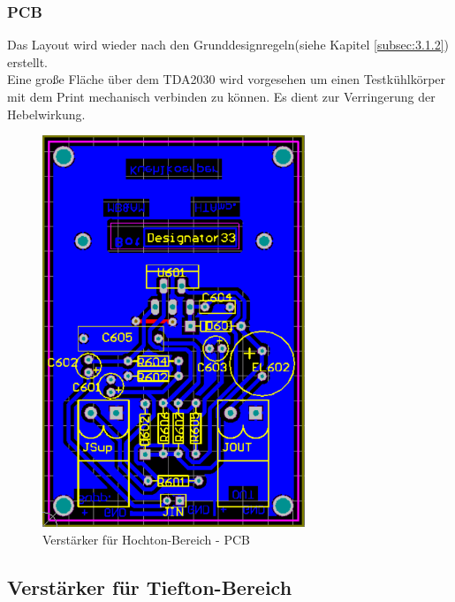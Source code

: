 \subsubsection{PCB}\label{subsec:4.5.3}
Das Layout wird wieder nach den Grunddesignregeln(siehe Kapitel \ref{subsec:3.1.2}) erstellt.\\
Eine große Fläche über dem TDA2030 wird vorgesehen um einen Testkühlkörper mit dem Print mechanisch verbinden zu können.
Es dient zur Verringerung der Hebelwirkung.

\begin{figure} [H]
	\centering	
	\includegraphics[width=0.7\textwidth]{img/Print6/HTVerstaerker-PCB.PNG}
	\caption{Verstärker für Hochton-Bereich - PCB}
	\label {fig:4.5.3.1}
\end{figure}


\newpage
\subsection{Verstärker für Tiefton-Bereich}
